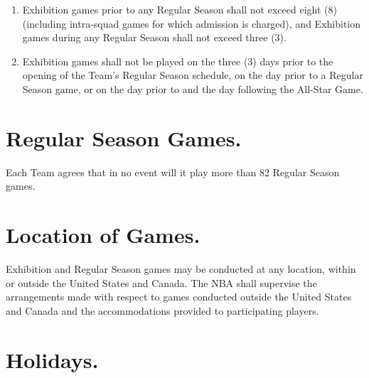 \documentclass[
]{book}
\providecommand{\tightlist}{%
  \setlength{\itemsep}{0pt}\setlength{\parskip}{0pt}}
\begin{document}
\begin{enumerate}
\def\labelenumi{(\alph{enumi})}
\tightlist
\item
  Exhibition games prior to any Regular Season shall not exceed eight (8) (including intra-squad games for which admission is charged), and Exhibition games during any Regular Season shall not exceed three (3).
\item
  Exhibition games shall not be played on the three (3) days prior to the opening of the Team's Regular Season schedule, on the day prior to a Regular Season game, or on the day prior to and the day following the All-Star Game.
\end{enumerate}

\hypertarget{regular-season-games.}{%
\section{Regular Season Games.}\label{regular-season-games.}}

Each Team agrees that in no event will it play more than 82 Regular Season games.

\hypertarget{location-of-games.}{%
\section{Location of Games.}\label{location-of-games.}}

Exhibition and Regular Season games may be conducted at any location, within or outside the United States and Canada. The NBA shall supervise the arrangements made with respect to games conducted outside the United States and Canada and the accommodations provided to participating players.

\hypertarget{holidays.}{%
\section{Holidays.}\label{holidays.}}
\end{document}
